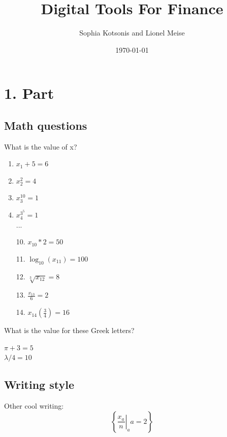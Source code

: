 \documentclass[10pt]{article}
\begin{document}
\title{Digital Tools For Finance}
\author{Sophia Kotsonis and Lionel Meise}
\date{\today}
\maketitle

\newpage

\tableofcontents


\newpage
\section{1. Part}
	\subsection{Math questions}

What is the value of x?
\begin{enumerate}
\item $x_1+5 = 6$\\
\item $x_2^2 = 4$\\
\item $x_3^{10} = 1$\\
\item $x_4^{3^5} = 1$\\

$...$\\
\item[10.] $x_{10} * 2 = 50$\\
\item[11.] $\log_{10}(x_{11}) = 100$\\
\item[12.] $\sqrt[3]{x_{12}} = 8$\\
\item[13.] $\frac{x_{13}}{6} = 2$\\
\item[14.] $x_{14}\left(\frac{3}{4}\right) = 16$\newline
\end{enumerate}

What is the value for these Greek letters?

$\pi + 3 = 5$\\
$\lambda / 4 = 10$\\

	\subsection{Writing style}

Other cool writing:
$$\left\{\left.\frac{x_a}{n}\right|_a a=2\right\}$$
\end{document}
